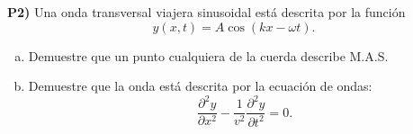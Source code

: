 
\textbf{P2)} Una onda transversal viajera sinusoidal está descrita por la función
\[
y(x,t)=A\cos(kx-\omega t).
\]
\begin{enumerate}[a)]
\item Demuestre que un punto cualquiera de la cuerda describe M.A.S.

\item Demuestre que la onda está descrita por la ecuación de ondas:
\[
\frac{\partial^2 y}{\partial x^2}-\frac{1}{v^2}\frac{\partial^2 y}{\partial t^2}=0. 
\]
\end{enumerate}